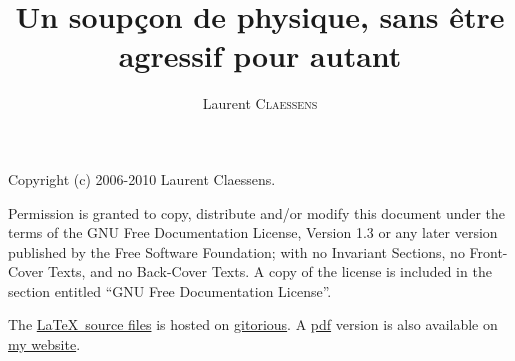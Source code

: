 
\thispagestyle{empty}
\title{Un soupçon de physique, sans être agressif pour autant}
\author{Laurent \textsc{Claessens}}
\maketitle

Copyright (c) 2006-2010  Laurent Claessens.

Permission is granted to copy, distribute and/or modify this document under the terms of the GNU Free Documentation License, Version 1.3 or any later version published by the Free Software Foundation; with no Invariant Sections, no Front-Cover Texts, and no Back-Cover Texts. A copy of the license is included in the section entitled ``GNU Free Documentation License''.

The \href{http://gitorious.org/echa}{\LaTeX\ source files} is hosted on \href{http://fr.wikipedia.org/wiki/Git}{gitorious}. A \href{http://student.ulb.ac.be/~lclaesse/echa.pdf}{pdf} version is also available on \href{http://student.ulb.ac.be/~lclaesse/}{my website}.


\vfill

\normalsize
